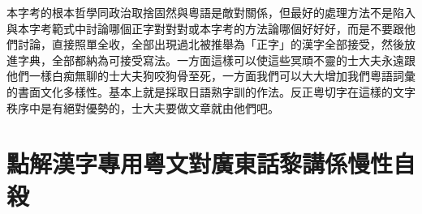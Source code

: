 本字考的根本哲學同政治取捨固然與粵語是敵對關係，但最好的處理方法不是陷入與本字考範式中討論哪個正字對對對或本字考的方法論哪個好好好，而是不要跟他們討論，直接照單全收，全部出現過北被推舉為「正字」的漢字全部接受，然後放進字典，全部都納為可接受寫法。一方面這樣可以使這些冥頑不靈的士大夫永遠跟他們一樣白痴無聊的士大夫狗咬狗骨至死，一方面我們可以大大增加我們粵語詞彙的書面文化多樣性。基本上就是採取日語熟字訓的作法。反正粵切字在這樣的文字秩序中是有絕對優勢的，士大夫要做文章就由他們吧。

\section{點解漢字專用粵文對廣東話黎講係慢性自殺}



